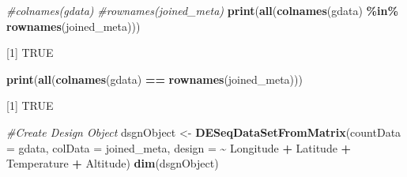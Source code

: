 \documentclass[
]{article}
\newenvironment{Shaded}{\begin{snugshade}}{\end{snugshade}}
\newcommand{\AttributeTok}[1]{\textcolor[rgb]{0.13,0.29,0.53}{#1}}
\newcommand{\CommentTok}[1]{\textcolor[rgb]{0.56,0.35,0.01}{\textit{#1}}}
\newcommand{\FunctionTok}[1]{\textcolor[rgb]{0.13,0.29,0.53}{\textbf{#1}}}
\newcommand{\NormalTok}[1]{#1}
\newcommand{\OtherTok}[1]{\textcolor[rgb]{0.56,0.35,0.01}{#1}}
\newcommand{\SpecialCharTok}[1]{\textcolor[rgb]{0.81,0.36,0.00}{\textbf{#1}}}
\newcommand{\StringTok}[1]{\textcolor[rgb]{0.31,0.60,0.02}{#1}}
\begin{document}
\begin{Shaded}
\end{Shaded}

\begin{Shaded}
\begin{Highlighting}[]
\CommentTok{\#colnames(gdata)}
\CommentTok{\#rownames(joined\_meta)}
\FunctionTok{print}\NormalTok{(}\FunctionTok{all}\NormalTok{(}\FunctionTok{colnames}\NormalTok{(gdata) }\SpecialCharTok{\%in\%} \FunctionTok{rownames}\NormalTok{(joined\_meta)))}
\end{Highlighting}
\end{Shaded}

{[}1{]} TRUE

\begin{Shaded}
\begin{Highlighting}[]
\FunctionTok{print}\NormalTok{(}\FunctionTok{all}\NormalTok{(}\FunctionTok{colnames}\NormalTok{(gdata) }\SpecialCharTok{==} \FunctionTok{rownames}\NormalTok{(joined\_meta)))}
\end{Highlighting}
\end{Shaded}

{[}1{]} TRUE

\begin{Shaded}
\begin{Highlighting}[]
\CommentTok{\#Create Design Object}
\NormalTok{dsgnObject }\OtherTok{\textless{}{-}} \FunctionTok{DESeqDataSetFromMatrix}\NormalTok{(}\AttributeTok{countData =}\NormalTok{ gdata, }
                                     \AttributeTok{colData =}\NormalTok{ joined\_meta,}
                                     \AttributeTok{design =} \SpecialCharTok{\textasciitilde{}}\NormalTok{ Longitude }\SpecialCharTok{+}\NormalTok{ Latitude }\SpecialCharTok{+}\NormalTok{ Temperature }\SpecialCharTok{+}\NormalTok{ Altitude)}
\FunctionTok{dim}\NormalTok{(dsgnObject)}
\end{Highlighting}
\end{Shaded}
\end{document}
